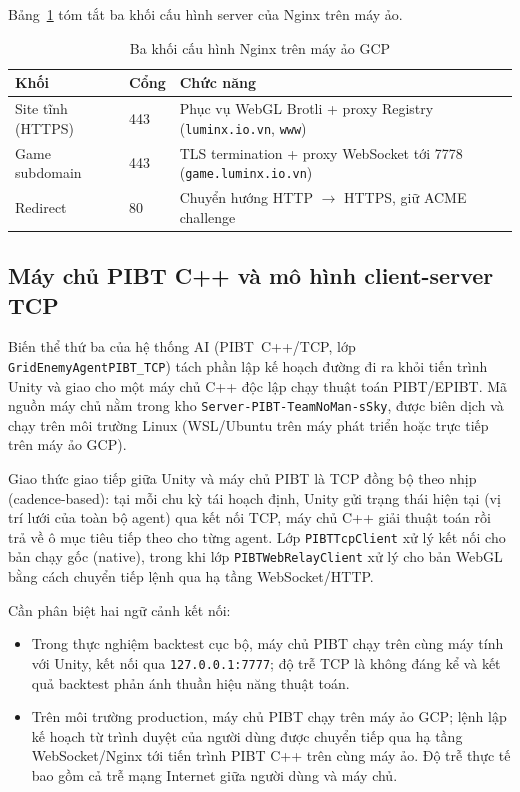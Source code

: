 \documentclass[../DoAn.tex]{subfiles}
\begin{document}
Bảng~\ref{tab:nginx_blocks} tóm tắt ba khối cấu hình server của Nginx trên máy ảo.

\begin{table}[htbp]
\centering
\caption{Ba khối cấu hình Nginx trên máy ảo GCP}
\label{tab:nginx_blocks}
\small
\begin{tabular}{llp{6.8cm}}
\hline
\textbf{Khối} & \textbf{Cổng} & \textbf{Chức năng} \\ \hline
Site tĩnh (HTTPS) & 443 & Phục vụ WebGL Brotli + proxy Registry
                            (\texttt{luminx.io.vn}, \texttt{www}) \\
Game subdomain     & 443 & TLS termination + proxy WebSocket tới 7778
                            (\texttt{game.luminx.io.vn}) \\
Redirect           &  80 & Chuyển hướng HTTP $\to$ HTTPS, giữ ACME challenge \\ \hline
\end{tabular}
\end{table}

\subsection{Máy chủ PIBT C++ và mô hình client-server TCP}

Biến thể thứ ba của hệ thống AI (PIBT~C++/TCP, lớp \texttt{GridEnemyAgent\allowbreak PIBT\_TCP}) tách
phần lập kế hoạch đường đi ra khỏi tiến trình Unity và giao cho một máy chủ C++ độc lập
chạy thuật toán PIBT/EPIBT. Mã nguồn máy chủ nằm trong kho
\texttt{Server-PIBT-TeamNoMan-sSky}, được biên dịch và chạy trên môi trường Linux
(WSL/Ubuntu trên máy phát triển hoặc trực tiếp trên máy ảo GCP).

Giao thức giao tiếp giữa Unity và máy chủ PIBT là TCP đồng bộ theo nhịp (cadence-based):
tại mỗi chu kỳ tái hoạch định, Unity gửi trạng thái hiện tại (vị trí lưới của toàn bộ
agent) qua kết nối TCP, máy chủ C++ giải thuật toán rồi trả về ô mục tiêu tiếp theo cho
từng agent. Lớp \texttt{PIBTTcpClient} xử lý kết nối cho bản chạy gốc (native), trong khi
lớp \texttt{PIBTWebRelayClient} xử lý cho bản WebGL bằng cách chuyển tiếp lệnh qua hạ tầng
WebSocket/HTTP.

Cần phân biệt hai ngữ cảnh kết nối:
\begin{itemize}
\item Trong thực nghiệm backtest cục bộ, máy chủ PIBT chạy trên cùng máy tính với Unity,
      kết nối qua \texttt{127.0.0.1:7777}; độ trễ TCP là không đáng kể và kết quả backtest
      phản ánh thuần hiệu năng thuật toán.
\item Trên môi trường production, máy chủ PIBT chạy trên máy ảo GCP; lệnh lập kế hoạch từ
      trình duyệt của người dùng được chuyển tiếp qua hạ tầng WebSocket/Nginx tới tiến
      trình PIBT C++ trên cùng máy ảo. Độ trễ thực tế bao gồm cả trễ mạng Internet giữa
      người dùng và máy chủ.
\end{itemize}
\end{document}
